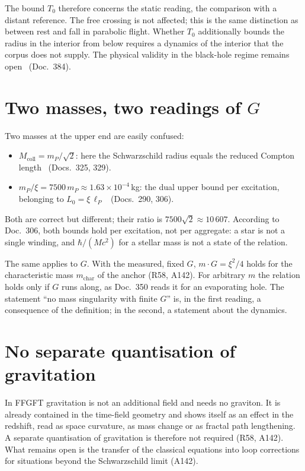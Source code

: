 The bound $T_0$ therefore concerns the static reading, the comparison with a distant reference.
The free crossing is not affected; this is the same distinction as between rest and fall in
parabolic flight. Whether $T_0$ additionally bounds the radius in the interior from below requires
a dynamics of the interior that the corpus does not supply. The physical validity in the
black-hole regime remains open \SM\ (Doc.~384).

\section{Two masses, two readings of \texorpdfstring{$G$}{G}}

Two masses at the upper end are easily confused:
\begin{itemize}[leftmargin=*,itemsep=1pt]
\item $M_{\text{coll}}=m_P/\sqrt2$: here the Schwarzschild radius equals the reduced Compton length
\BM\ (Docs.~325, 329).
\item $m_P/\xi=7500\,m_P\approx1.63\times10^{-4}$\,kg: the dual upper bound per excitation,
belonging to $L_0=\xi\,\ell_P$ \KM\ (Docs.~290, 306).
\end{itemize}
Both are correct but different; their ratio is $7500\sqrt2\approx10\,607$. According to Doc.~306,
both bounds hold per excitation, not per aggregate: a star is not a single winding, and
$\hbar/(Mc^2)$ for a stellar mass is not a state of the relation.

The same applies to $G$. With the measured, fixed $G$, $m\cdot G=\xi^2/4$ holds for the
characteristic mass $m_{\text{char}}$ of the anchor (R58, A142). For arbitrary $m$ the relation
holds only if $G$ runs along, as Doc.~350 reads it for an evaporating hole. The statement ``no mass
singularity with finite $G$'' is, in the first reading, a consequence of the definition; in the
second, a statement about the dynamics.

\section{No separate quantisation of gravitation}

In FFGFT gravitation is not an additional field and needs no graviton. It is already contained in
the time-field geometry and shows itself as an effect in the redshift, read as space curvature, as
mass change or as fractal path lengthening. A separate quantisation of gravitation is therefore
not required (R58, A142). What remains open is the transfer of the classical equations into loop
corrections for situations beyond the Schwarzschild limit (A142).

